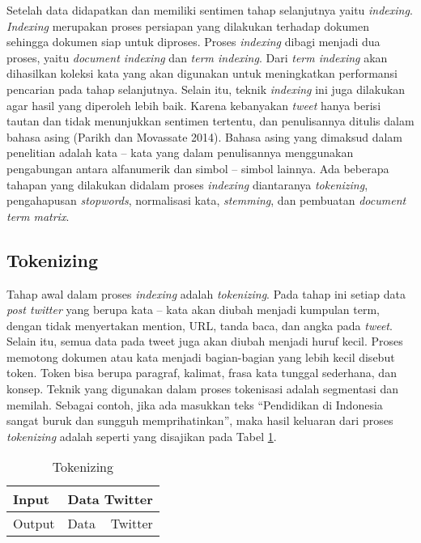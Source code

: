 Setelah data didapatkan dan memiliki sentimen tahap selanjutnya yaitu \textit{indexing}. \textit{Indexing} merupakan proses persiapan yang dilakukan terhadap dokumen sehingga dokumen siap untuk diproses. Proses \textit{indexing} dibagi menjadi dua proses, yaitu \textit{document indexing} dan \textit{term indexing}. Dari \textit{term indexing} akan dihasilkan koleksi kata yang akan digunakan untuk meningkatkan performansi pencarian pada tahap selanjutnya. Selain itu, teknik \textit{indexing} ini juga dilakukan agar hasil yang diperoleh lebih baik. Karena kebanyakan \textit{tweet} hanya berisi tautan dan tidak menunjukkan sentimen tertentu, dan penulisannya ditulis dalam bahasa asing (Parikh dan Movassate 2014). Bahasa asing yang dimaksud dalam penelitian adalah kata – kata yang dalam penulisannya menggunakan pengabungan antara alfanumerik dan simbol – simbol lainnya. Ada beberapa tahapan  yang dilakukan didalam proses \textit{indexing} diantaranya \textit{tokenizing}, pengahapusan \textit{stopwords}, normalisasi kata, \textit{stemming}, dan pembuatan \textit{document term matrix}.


\subsection*{Tokenizing}
Tahap awal dalam proses \textit{indexing} adalah \textit{tokenizing}. Pada tahap ini setiap data \textit{post twitter} yang berupa kata – kata akan diubah menjadi kumpulan term, dengan tidak menyertakan mention, URL, tanda baca, dan angka pada \textit{tweet}. Selain itu, semua data pada tweet juga akan diubah menjadi huruf kecil. Proses memotong dokumen atau kata menjadi bagian-bagian yang lebih kecil disebut token. Token bisa berupa paragraf, kalimat, frasa kata tunggal sederhana, dan konsep. Teknik yang digunakan dalam proses tokenisasi adalah segmentasi dan memilah. Sebagai contoh, jika ada masukkan teks “Pendidikan di Indonesia sangat buruk dan sungguh memprihatinkan”, maka hasil keluaran dari proses \textit{tokenizing} adalah seperti yang disajikan pada Tabel \ref{tab:tokenizing}.

\begin{table}[hbt]
	\caption{Tokenizing}
	\centering
	\begin{tabular}{llr}
		\toprule
		Input & \multicolumn{2}{c}{Data Twitter} \\
		\midrule
		Output & Data & Twitter \\
		\bottomrule
	\end{tabular}
	\label{tab:tokenizing}
\end{table}

